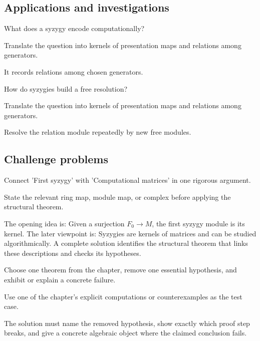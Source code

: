 \subsection*{Applications and investigations}

\begin{exercise}\label{exr:v24-expand-13}
What does a syzygy encode computationally?
\end{exercise}
\begin{hint}
Translate the question into kernels of presentation maps and relations among generators.
\end{hint}
\begin{solution}
It records relations among chosen generators.
\end{solution}

\begin{exercise}\label{exr:v24-expand-14}
How do syzygies build a free resolution?
\end{exercise}
\begin{hint}
Translate the question into kernels of presentation maps and relations among generators.
\end{hint}
\begin{solution}
Resolve the relation module repeatedly by new free modules.
\end{solution}

\subsection*{Challenge problems}

\begin{exercise}\label{exr:v24-expand-15}
Connect 'First syzygy' with 'Computational matrices' in one rigorous argument.
\end{exercise}
\begin{hint}
State the relevant ring map, module map, or complex before applying the structural theorem.
\end{hint}
\begin{solution}
The opening idea is: Given a surjection $F_0\to M$, the first syzygy module is its kernel. The later viewpoint is: Syzygies are kernels of matrices and can be studied algorithmically. A complete solution identifies the structural theorem that links these descriptions and checks its hypotheses.
\end{solution}

\begin{exercise}\label{exr:v24-expand-16}
Choose one theorem from the chapter, remove one essential hypothesis, and exhibit or explain a concrete failure.
\end{exercise}
\begin{hint}
Use one of the chapter's explicit computations or counterexamples as the test case.
\end{hint}
\begin{solution}
The solution must name the removed hypothesis, show exactly which proof step breaks, and give a concrete algebraic object where the claimed conclusion fails.
\end{solution}

